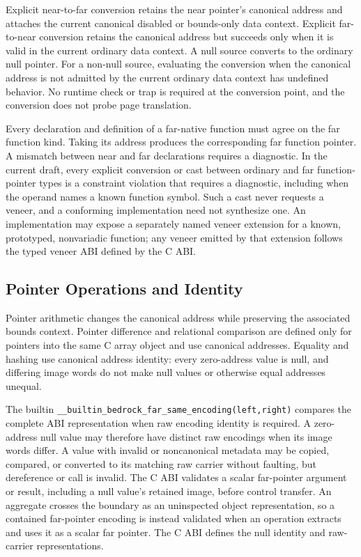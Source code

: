 \documentclass[10pt,twoside]{article}
\begin{document}
Explicit near-to-far conversion retains the near pointer's canonical address
and attaches the current canonical disabled or bounds-only data context.
Explicit far-to-near conversion retains the canonical address but succeeds
only when it is valid in the current ordinary data context. A null source
converts to the ordinary null pointer. For a non-null source, evaluating the
conversion when the canonical address is not admitted by the current ordinary
data context has undefined behavior. No runtime check or trap is required at
the conversion point, and the conversion does not probe page translation.

Every declaration and definition of a far-native function must agree on the
far function kind. Taking its address produces the corresponding far function
pointer. A mismatch between near and far declarations requires a diagnostic.
In the current draft, every explicit conversion or cast between ordinary and far
function-pointer types is a constraint violation that requires a diagnostic,
including when the operand names a known function symbol. Such a cast never
requests a veneer, and a conforming implementation need not synthesize one.
An implementation may expose a separately named veneer extension for a known,
prototyped, nonvariadic function; any veneer emitted by that extension follows
the typed veneer ABI defined by the C ABI.

\subsection{Pointer Operations and Identity}
Pointer arithmetic changes the canonical address while preserving the
associated bounds context. Pointer difference and relational comparison are
defined only for pointers into the same C array object and use canonical
addresses. Equality and hashing use canonical address identity: every
zero-address value is null, and differing image words do not make null values or
otherwise equal addresses unequal.

The builtin
\texttt{\_\_builtin\_bedrock\_far\_same\_encoding(left,right)} compares the
complete ABI representation when raw encoding identity is required.
A zero-address null value may therefore have distinct raw encodings when its
image words differ. A value with invalid or noncanonical metadata may be copied,
compared, or converted to its matching raw carrier without faulting, but
dereference or call is invalid. The C ABI validates a scalar far-pointer
argument or result, including a null value's retained image, before control
transfer. An aggregate crosses the boundary as an uninspected object
representation, so a contained far-pointer encoding is instead validated when
an operation extracts and uses it as a scalar far pointer. The C ABI defines
the null identity and raw-carrier representations.
\end{document}
